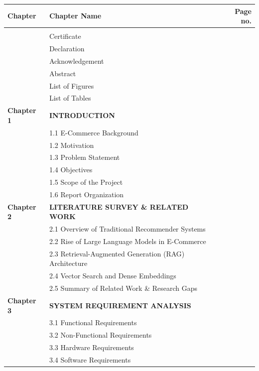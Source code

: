 \documentclass[12pt,a4paper]{article}
\begin{document}
\noindent
\begin{longtable}{@{} p{2.2cm} p{11.8cm} r @{}}
\textbf{Chapter} & \textbf{Chapter Name} & \textbf{Page no.} \\[4pt]
\hline \\[-6pt]
& Certificate & \pageref{page:certificate} \\[4pt]
& Declaration & \pageref{page:declaration} \\[4pt]
& Acknowledgement & \pageref{page:acknowledgement} \\[4pt]
& Abstract & \pageref{page:abstract} \\[4pt]
& List of Figures & \pageref{page:lof} \\[4pt]
& List of Tables & \pageref{page:lot} \\[6pt]
\textbf{Chapter 1} & \textbf{INTRODUCTION} & \pageref{chap:1} \\[4pt]
& 1.1 E-Commerce Background & \pageref{sec:1.1} \\[3pt]
& 1.2 Motivation & \pageref{sec:1.2} \\[3pt]
& 1.3 Problem Statement & \pageref{sec:1.3} \\[3pt]
& 1.4 Objectives & \pageref{sec:1.4} \\[3pt]
& 1.5 Scope of the Project & \pageref{sec:1.5} \\[3pt]
& 1.6 Report Organization & \pageref{sec:1.6} \\[6pt]
\textbf{Chapter 2} & \textbf{LITERATURE SURVEY \& RELATED WORK} & \pageref{chap:2} \\[4pt]
& 2.1 Overview of Traditional Recommender Systems & \pageref{sec:2.1} \\[3pt]
& 2.2 Rise of Large Language Models in E-Commerce & \pageref{sec:2.2} \\[3pt]
& 2.3 Retrieval-Augmented Generation (RAG) Architecture & \pageref{sec:2.3} \\[3pt]
& 2.4 Vector Search and Dense Embeddings & \pageref{sec:2.4} \\[3pt]
& 2.5 Summary of Related Work \& Research Gaps & \pageref{sec:2.5} \\[6pt]
\textbf{Chapter 3} & \textbf{SYSTEM REQUIREMENT ANALYSIS} & \pageref{chap:3} \\[4pt]
& 3.1 Functional Requirements & \pageref{sec:3.1} \\[3pt]
& 3.2 Non-Functional Requirements & \pageref{sec:3.2} \\[3pt]
& 3.3 Hardware Requirements & \pageref{sec:3.3} \\[3pt]
& 3.4 Software Requirements & \pageref{sec:3.4} \\[6pt]

\end{longtable}
\end{document}
